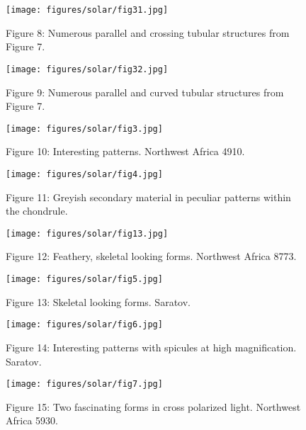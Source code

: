 \documentclass[a4paper, 12pt, oneside]{article}
\begin{document}
\begin{figure}[b]
\centering
\texttt{[image: figures/solar/fig31.jpg]}
\caption{Figure 8: Numerous parallel and crossing tubular structures from Figure 7.}
\end{figure}
\clearpage

\begin{figure}[b]
\texttt{[image: figures/solar/fig32.jpg]}
\caption{Figure 9: Numerous parallel and curved tubular structures from Figure 7.}
\centering
\end{figure}
\clearpage

\begin{figure}[b]
\centering
\texttt{[image: figures/solar/fig3.jpg]}
\caption{Figure 10: Interesting patterns. Northwest Africa 4910.}
\end{figure}
\clearpage

\begin{figure}[b]
\centering
\texttt{[image: figures/solar/fig4.jpg]}
\caption{Figure 11: Greyish secondary material in peculiar patterns within the chondrule.}
\end{figure}
\clearpage

\begin{figure}[b]
\centering
\texttt{[image: figures/solar/fig13.jpg]}
\caption{Figure 12: Feathery, skeletal looking forms. Northwest Africa 8773.}
\end{figure}
\clearpage

\begin{figure}[b]
\texttt{[image: figures/solar/fig5.jpg]}
\caption{Figure 13: Skeletal looking forms. Saratov.}
\centering
\end{figure}
\clearpage

\begin{figure}[b]
\texttt{[image: figures/solar/fig6.jpg]}
\caption{Figure 14: Interesting patterns with spicules at high magnification. Saratov.}
\centering
\end{figure}
\clearpage

\begin{figure}[b]
\texttt{[image: figures/solar/fig7.jpg]}
\caption{Figure 15: Two fascinating forms in cross polarized light. Northwest Africa 5930.}
\centering
\end{figure}
\clearpage
\end{document}
